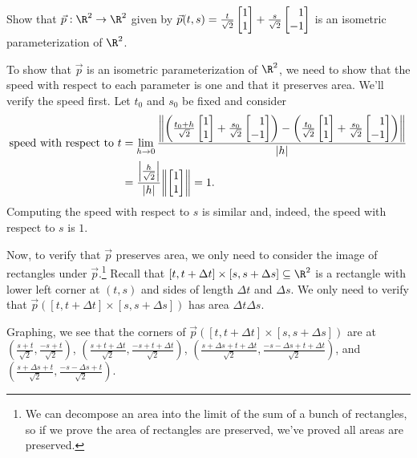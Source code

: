 \begin{example}
	Show that $\vec p:\R^2\to\R^2$ given by $\vec p(t,s)=\tfrac{t}{\sqrt{2}}\mat{1\\1}+\tfrac{s}{\sqrt{2}}\mat{1\\-1}$
	is an isometric parameterization of $\R^2$.

	To show that $\vec p$ is an isometric parameterization of $\R^2$, we need to show that the speed with respect
	to each parameter is one and that it preserves area.  We'll verify the speed first.
	Let $t_0$ and $s_0$ be fixed and consider
	\begin{align*}
		\text{speed with respect to $t$} &= \lim_{h\to 0} 
		\frac{\norm*{\left(\tfrac{t_0+h}{\sqrt{2}} \mat{1\\1} + \tfrac{s_0}{\sqrt{2}}\mat{1\\-1}\right)
		-\left(\tfrac{t_0}{\sqrt{2}} \mat{1\\1} + \tfrac{s_0}{\sqrt{2}}\mat{1\\-1}\right)}
		}{\abs{h}}\\
		&= \frac{\abs*{\tfrac{h}{\sqrt{2}}}}{\abs{h}}\norm*{\mat{1\\1}} = 1.
	\end{align*}
	Computing the speed with respect to $s$ is similar and, indeed, the speed with
	respect to $s$ is $1$.

	Now, to verify that $\vec p$ preserves area, we only need to consider the image
	of rectangles under $\vec p$.\footnote{
		We can decompose an area into the limit of the sum of a bunch of
		rectangles, so if we prove the area of rectangles are preserved, we've 
		proved all areas are preserved.}
	Recall that $[t,t+\Delta t]\times[s,s+\Delta s]\subseteq\R^2$ is a rectangle with 
	lower left corner at $(t,s)$ and sides of length $\Delta t$ and $\Delta s$.
	We only need to verify
	that $\vec p([t,t+\Delta t]\times[s,s+\Delta s])$ has area $\Delta t\Delta s$.

	Graphing, we see that the corners of $\vec p([t,t+\Delta t]\times[s,s+\Delta s])$ are at
	$(\tfrac{s+t}{\sqrt{2}}, \tfrac{-s+t}{\sqrt{2}})$,
	$(\tfrac{s+t+\Delta t}{\sqrt{2}}, \tfrac{-s+t + \Delta t}{\sqrt{2}})$,
	$(\tfrac{s+\Delta s+t+\Delta t}{\sqrt{2}}, \tfrac{-s-\Delta s+t+\Delta t}{\sqrt{2}})$, and
	$(\tfrac{s+\Delta s+t}{\sqrt{2}}, \tfrac{-s-\Delta s+t}{\sqrt{2}})$.

	\begin{center}
\end{center}
\end{example}
